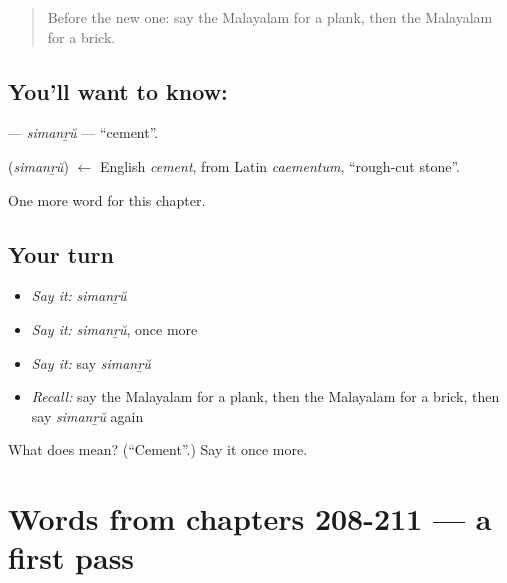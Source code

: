 \label{lesson:ML-C216-simanru}



\begin{quote}
Before the new one: say the Malayalam for a plank, then the Malayalam for a brick.
\end{quote}

\subsection*{You'll want to know: }
\textbf{} — \emph{simanṟŭ} — \textquotedblleft{}cement\textquotedblright{}.

\begin{cousinweb}
\textbf{} (\emph{simanṟŭ}) $\leftarrow$ English \emph{cement}, from Latin \emph{caementum}, \textquotedblleft{}rough-cut stone\textquotedblright{}.
\end{cousinweb}

\begin{grammarlens}[title={What you've built}]
One more word for this chapter.
\end{grammarlens}

\subsection*{Your turn}
\begin{itemize}
\raggedright
  \item \emph{Say it:} \emph{simanṟŭ}
  \item \emph{Say it:} \emph{simanṟŭ}, once more
  \item \emph{Say it:} say \emph{simanṟŭ}
  \item \emph{Recall:} say the Malayalam for a plank, then the Malayalam for a brick, then say \emph{simanṟŭ} again
\end{itemize}

\begin{tcolorbox}[breakable,colback=teal!4,colframe=teal!35!black,title={Before you move on}]
What does  mean? (\textquotedblleft{}Cement\textquotedblright{}.) Say it once more.
\end{tcolorbox}
\section[(dialogue)]{Words from chapters 208-211 — a first pass}

\label{lesson:ML-R216-first-pass-words-from-chapters-208-211}



